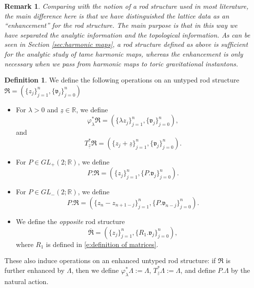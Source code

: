 \documentclass[a4paper,11pt]{amsart}
\newtheorem{remark}[theorem]{Remark}
\theoremstyle{definition}
\newtheorem{definition}[theorem]{Definition}
\numberwithin{equation}{section}
\newcommand{\mR} {\mathfrak R}
\begin{document}
\begin{remark}
    Comparing with the notion of a rod structure used in most literature, the main difference here is that we have distinguished the lattice data as an ``enhancement'' for the rod structure. The main purpose is that in this way we have separated the analytic information and the topological information. As can be seen in Section \ref{sec:harmonic maps}, a rod structure defined as above  is sufficient for the analytic study of tame harmonic maps, whereas the enhancement is only necessary when we pass from harmonic maps to toric gravitational instantons. 
\end{remark}
\begin{definition}
We define the following operations on an untyped rod structure \( \mathfrak{R} = (\{z_j\}_{j=1}^n, \{\mathfrak{v}_j\}_{j=0}^n)\)
\begin{itemize}
    \item For \( \lambda > 0 \) and \( \underline{z} \in \mathbb{R} \), we define  
    \[
    \varphi_\lambda ^* \mathfrak{R} = \left(\{\lambda z_j\}_{j=1}^{n}, \{\mathfrak{v}_j\}_{j=0}^{n} \right),
    \]
    and  
    \[
    T_{\underline{z}}^* \mathfrak{R} = \left(\{ z_j + \underline{z} \}_{j=1}^{n}, \{\mathfrak{v}_j\}_{j=0}^{n} \right).
    \]
   
        \item For \( P \in GL_{+}(2; \mathbb{R}) \), we define  
    \[
    P . \mathfrak{R} = \left(\{z_j\}_{j=1}^n, \{P. \mathfrak{v}_j\}_{j=0}^n \right).
    \]
    \item For \( P \in GL_{-}(2; \mathbb{R}) \), we define  
    \[
    P . \mathfrak{R} = \left(\{z_n-z_{n+1-j}\}_{j=1}^n, \{P. \mathfrak{v}_{n-j}\}_{j=0}^n \right).
    \]
     \item { We define the \emph{opposite} rod structure
       \[
   \overline{\mathfrak{R}} = \left(\{z_j\}_{j=1}^n, \{R_1.\mathfrak{v}_{j}\}_{j=0}^n \right), 
    \]
    where $R_1$ is defined in \eqref{e:definition of matrices}.}
\end{itemize}

These also induce operations on an enhanced untyped rod structure: if $\mR$ is further enhanced by $\Lambda$, then we define
    $\varphi_\lambda^*\Lambda:=\Lambda$, 
 $T_{\underline z}^*\Lambda:=\Lambda$, and define $P.\Lambda$  by the natural action.
\end{definition}
\end{document}
